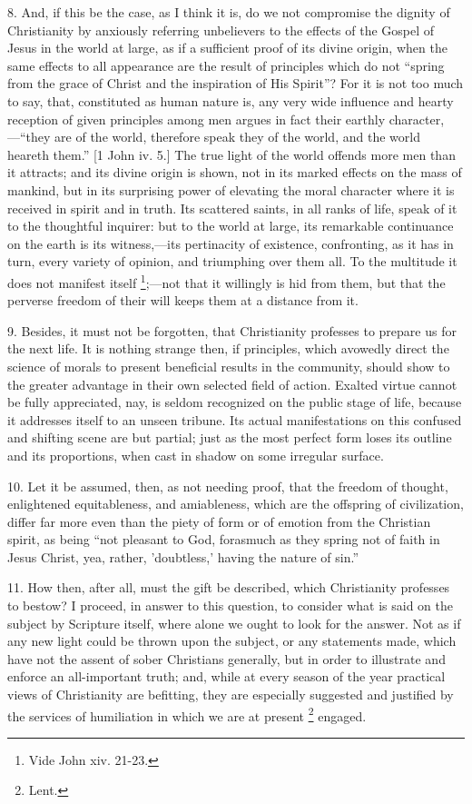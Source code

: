 8. And, if this be the case, as I think it is, do we not compromise
the dignity of Christianity by anxiously referring unbelievers to the
effects of the Gospel of Jesus in the world at large, as if a
sufficient proof of its divine origin, when the same effects to all
appearance are the result of principles which do not ``spring from
the grace of Christ and the inspiration of His Spirit''? For it is
not too much to say, that, constituted as human nature is, any very
wide influence and hearty reception of given principles among men
argues in fact their earthly character,—``they are of the world,
therefore speak they of the world, and the world heareth them.''
[1 John iv. 5.] The true light of the world offends more men than it
attracts; and its divine origin is shown, not in its marked effects on
the mass of mankind, but in its surprising power of elevating the
moral character where it is received in spirit and in truth. Its
scattered saints, in all ranks of life, speak of it to the thoughtful
inquirer: but to the world at large, its remarkable continuance on the
earth is its witness,—its pertinacity of existence, confronting, as
it has in turn, every variety of opinion, and triumphing over them
all. To the multitude it does not manifest itself \footnote{Vide John xiv.
21-23.};—not that it willingly is hid from them, but that the
perverse freedom of their will keeps them at a distance from it.

9. Besides, it must not be forgotten, that Christianity professes
to prepare us for the next life. It is nothing strange then, if
principles, which avowedly direct the science of morals to present
beneficial results in the community, should show to the greater
advantage in their own selected field of action. Exalted virtue cannot
be fully appreciated, nay, is seldom recognized on the public stage of
life, because it addresses itself to an unseen tribune. Its actual
manifestations on this confused and shifting scene are but partial;
just as the most perfect form loses its outline and its proportions,
when cast in shadow on some irregular surface.

10. Let it be assumed, then, as not needing proof, that the freedom
of thought, enlightened equitableness, and amiableness, which are the
offspring of civilization, differ far more even than the piety of form
or of emotion from the Christian spirit, as being ``not pleasant
to God, forasmuch as they spring not of faith in Jesus Christ, yea,
rather, 'doubtless,' having the nature of sin.''

11. How then, after all, must the gift be described, which
Christianity professes to bestow? I proceed, in answer to this
question, to consider what is said on the subject by Scripture itself,
where alone we ought to look for the answer. Not as if any new light
could be thrown upon the subject, or any statements made, which have
not the assent of sober Christians generally, but in order to
illustrate and enforce an all-important truth; and, while at every
season of the year practical views of Christianity are befitting, they
are especially suggested and justified by the services of humiliation
in which we are at present \footnote{Lent.}
engaged.

